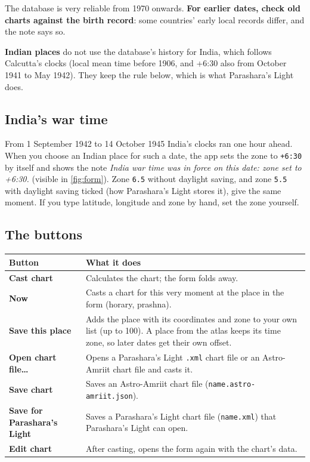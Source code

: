 \documentclass[11pt, a4paper]{article}
\newcommand{\shot}[1]{}
\newcommand{\app}{Astro-Amriit}
\newcommand{\PL}{Parashara's Light}
\newcommand{\ex}[1]{\texttt{#1}}             %
\begin{document}
\shot{atlaszone}

\begin{warnbox}\kpit The database is very reliable from 1970 onwards. \textbf{For earlier dates, check old
charts against the birth record}: some countries' early local records differ, and the note says so.\end{warnbox}

\textbf{Indian places} do not use the database's history for India, which follows Calcutta's clocks (local
mean time before 1906, and +6:30 also from October 1941 to May 1942). They keep the rule below, which is what
\PL{} does.

\subsection{India's war time}
From 1 September 1942 to 14 October 1945 India's clocks ran one hour ahead. When you choose an Indian
place for such a date, the app sets the zone to \ex{+6:30} by itself and shows the note
\emph{India war time was in force on this date: zone set to +6:30.} (visible in \autoref{fig:form}).
Zone \ex{6.5} without daylight saving, and zone \ex{5.5} with daylight saving ticked (how \PL{} stores it),
give the same moment. If you type latitude, longitude and zone by hand, set the zone yourself.

\subsection{The buttons}
\begin{tabularx}{\linewidth}{>{\bfseries}l X}
\toprule
Button & What it does \\
\midrule
Cast chart & Calculates the chart; the form folds away. \\
Now & Casts a chart for this very moment at the place in the form (horary, prashna). \\
Save this place & Adds the place with its coordinates and zone to your own list (up to 100). A place from the atlas keeps its time zone, so later dates get their own offset. \\
Open chart file… & Opens a \PL{} \ex{.xml} chart file or an \app{} chart file and casts it. \\
Save chart & Saves an \app{} chart file (\ex{name.astro-amriit.json}). \\
Save for Parashara's Light & Saves a \PL{} chart file (\ex{name.xml}) that \PL{} can open. \\
Edit chart & After casting, opens the form again with the chart's data. \\
\bottomrule
\end{tabularx}
\end{document}
